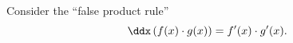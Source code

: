 \documentclass{ximera}
\begin{document}
Consider the ``false product rule''
\[
\ddx\left(f(x) \cdot g(x)\right) = f'(x)\cdot g'(x).
\]
\end{document}
